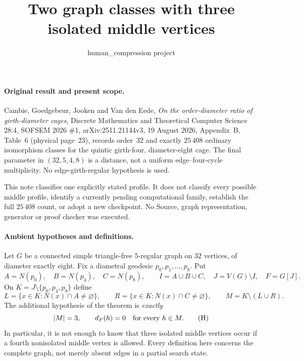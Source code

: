 \documentclass[11pt]{article}
\title{Two graph classes with three isolated middle vertices}
\author{human\_compression project}
\date{}
\begin{document}
\maketitle

\paragraph{Original result and present scope.}
Cambie, Goedgebeur, Jooken and Van den Eede,
\emph{On the order-diameter ratio of girth-diameter cages},
Discrete Mathematics and Theoretical Computer Science 28:4, SOFSEM 2026
\#1, arXiv:2511.21144v3, 19 August 2026, Appendix~B, Table~6
(physical page~23), records order~32 and exactly $25\,408$ ordinary
isomorphism classes for the quintic girth-four, diameter-eight cage.
The final parameter in $(32,5,4,8)$ is a distance, not a uniform
edge--four-cycle multiplicity. No edge-girth-regular hypothesis is used.

This note classifies one explicitly stated profile. It does not classify
every possible middle profile, identify a currently pending computational
family, establish the full $25\,408$ count, or adopt a new checkpoint.
No Source, graph representation, generator or proof checker was executed.

\paragraph{Ambient hypotheses and definitions.}
Let $G$ be a connected simple triangle-free $5$-regular graph on $32$
vertices, of diameter exactly eight. Fix a diametral geodesic
$p_0,p_1,\ldots,p_8$. Put
\[
 A=N(p_0),\quad B=N(p_4),\quad C=N(p_8),\qquad
 I=A\cup B\cup C,\quad J=V(G)\setminus I,\quad F=G[J].
\]
On $K=J\setminus\{p_0,p_4,p_8\}$ define
\[
 L=\{x\in K:N(x)\cap A\ne\varnothing\},\qquad
 R=\{x\in K:N(x)\cap C\ne\varnothing\},\qquad
 M=K\setminus(L\cup R).
\]
The additional hypothesis of the theorem is \emph{exactly}
\[
 |M|=3,\qquad d_F(h)=0\quad\hbox{for every }h\in M.       \tag{H}
\]
In particular, it is not enough to know that three isolated middle
vertices occur if a fourth nonisolated middle vertex is allowed.
Every definition here concerns the complete graph, not merely absent
edges in a partial search state.
\end{document}

